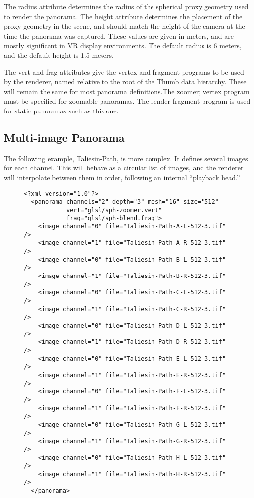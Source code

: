 \documentclass[article,twocolumn,10pt]{memoir}
\begin{document}
\begin{Spacing}{1.1}
The radius attribute determines the radius of the spherical proxy geometry used to render the panorama. The height attribute determines the placement of the proxy geometry in the scene, and should match the height of the camera at the time the panorama was captured. These values are given in meters, and are mostly significant in VR display environments. The default radius is 6 meters, and the default height is 1.5 meters.

The vert and frag attributes give the vertex and fragment programs to be used by the renderer, named relative to the root of the Thumb data hierarchy. These will remain the same for most panorama definitions.The zoomer; vertex program must be specified for zoomable panoramas. The render fragment program is used for static panoramas such as this one.

\subsection{Multi-image Panorama}

The following example, Taliesin-Path, is more complex. It defines several images for each channel. This will behave as a circular list of images, and the renderer will interpolate between them in order, following an internal “playback head.”

\begin{figure*}
\begin{verbatim}
<?xml version="1.0"?>
  <panorama channels="2" depth="3" mesh="16" size="512"
            vert="glsl/sph-zoomer.vert"
            frag="glsl/sph-blend.frag">
    <image channel="0" file="Taliesin-Path-A-L-512-3.tif" />
    <image channel="1" file="Taliesin-Path-A-R-512-3.tif" />
    <image channel="0" file="Taliesin-Path-B-L-512-3.tif" />
    <image channel="1" file="Taliesin-Path-B-R-512-3.tif" />
    <image channel="0" file="Taliesin-Path-C-L-512-3.tif" />
    <image channel="1" file="Taliesin-Path-C-R-512-3.tif" />
    <image channel="0" file="Taliesin-Path-D-L-512-3.tif" />
    <image channel="1" file="Taliesin-Path-D-R-512-3.tif" />
    <image channel="0" file="Taliesin-Path-E-L-512-3.tif" />
    <image channel="1" file="Taliesin-Path-E-R-512-3.tif" />
    <image channel="0" file="Taliesin-Path-F-L-512-3.tif" />
    <image channel="1" file="Taliesin-Path-F-R-512-3.tif" />
    <image channel="0" file="Taliesin-Path-G-L-512-3.tif" />
    <image channel="1" file="Taliesin-Path-G-R-512-3.tif" />
    <image channel="0" file="Taliesin-Path-H-L-512-3.tif" />
    <image channel="1" file="Taliesin-Path-H-R-512-3.tif" />
  </panorama>
\end{verbatim}
\end{figure*}


\end{Spacing}
\end{document}

